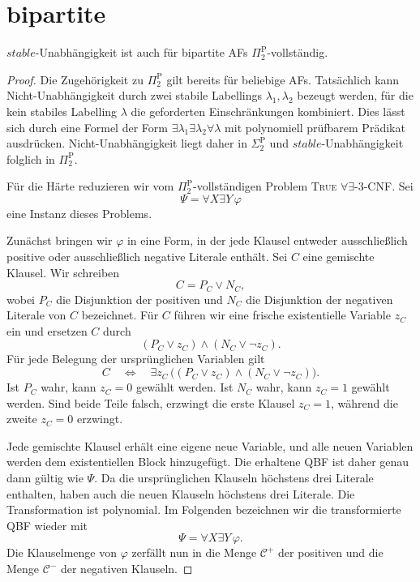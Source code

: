 \chapter{bipartite}
\label{ch:bipartite}

\begin{Proposition}
\label{prop:bip-st-ind-hard}
    \(stable\)-Unabhängigkeit ist auch für bipartite AFs
    \(\Pi_2^{\mathrm P}\)-vollständig.
\end{Proposition}

\begin{proof}
Die Zugehörigkeit zu \(\Pi_2^{\mathrm P}\) gilt bereits für beliebige AFs.
Tatsächlich kann Nicht-Unabhängigkeit durch zwei stabile Labellings
\(\lambda_1,\lambda_2\) bezeugt werden, für die kein stabiles Labelling
\(\lambda\) die geforderten Einschränkungen kombiniert. Dies lässt sich
durch eine Formel der Form
\(\exists\lambda_1\exists\lambda_2\forall\lambda\) mit polynomiell
prüfbarem Prädikat ausdrücken. Nicht-Unabhängigkeit liegt daher in
\(\Sigma_2^{\mathrm P}\) und \(stable\)-Unabhängigkeit folglich in
\(\Pi_2^{\mathrm P}\).

Für die Härte reduzieren wir vom \(\Pi_2^{\mathrm P}\)-vollständigen Problem
\textsc{True \(\forall\exists\)-3-CNF}. Sei
\[
    \Psi=\forall X\exists Y\,\varphi
\]
eine Instanz dieses Problems.

Zunächst bringen wir \(\varphi\) in eine Form, in der jede Klausel entweder
ausschließlich positive oder ausschließlich negative Literale enthält.
Sei \(C\) eine gemischte Klausel. Wir schreiben
\[
    C=P_C\lor N_C,
\]
wobei \(P_C\) die Disjunktion der positiven und \(N_C\) die Disjunktion
der negativen Literale von \(C\) bezeichnet. Für \(C\) führen wir eine
frische existentielle Variable \(z_C\) ein und ersetzen \(C\) durch
\[
    (P_C\lor z_C)\land(N_C\lor\neg z_C).
\]
Für jede Belegung der ursprünglichen Variablen gilt
\[
    C
    \quad\Longleftrightarrow\quad
    \exists z_C\,
    \bigl((P_C\lor z_C)\land(N_C\lor\neg z_C)\bigr).
\]
Ist \(P_C\) wahr, kann \(z_C=0\) gewählt werden. Ist \(N_C\) wahr, kann
\(z_C=1\) gewählt werden. Sind beide Teile falsch, erzwingt die erste
Klausel \(z_C=1\), während die zweite \(z_C=0\) erzwingt.

Jede gemischte Klausel erhält eine eigene neue Variable, und alle neuen
Variablen werden dem existentiellen Block hinzugefügt. Die erhaltene QBF
ist daher genau dann gültig wie \(\Psi\). Da die ursprünglichen Klauseln
höchstens drei Literale enthalten, haben auch die neuen Klauseln höchstens
drei Literale. Die Transformation ist polynomial. Im Folgenden bezeichnen
wir die transformierte QBF wieder mit
\[
    \Psi=\forall X\exists Y\,\varphi.
\]
Die Klauselmenge von \(\varphi\) zerfällt nun in die Menge
\(\mathcal C^+\) der positiven und die Menge \(\mathcal C^-\) der
negativen Klauseln.


\end{proof}
